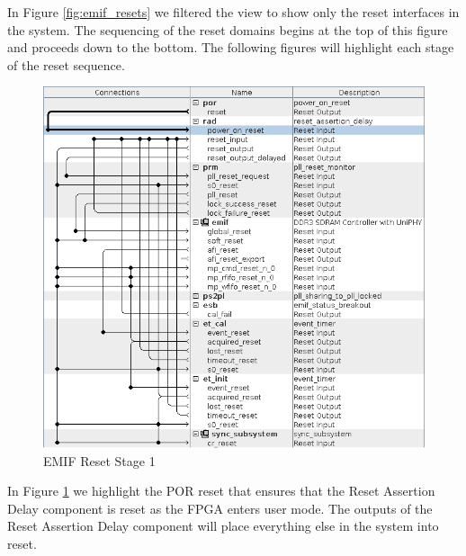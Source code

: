 \documentclass{article}
\begin{document}
\begin{flushleft}
In Figure \ref{fig:emif_resets} we filtered the view to show only the reset interfaces in the system.  The sequencing of the reset domains begins at the top of this figure and proceeds down to the bottom.  The following figures will highlight each stage of the reset sequence.

\begin{figure}[H]
\centering
\includegraphics[scale=0.675]{emif_reset_stage_1}
\caption{EMIF Reset Stage 1}
\label{fig:emif_reset_stage_1}
\end{figure}

In Figure \ref{fig:emif_reset_stage_1} we highlight the POR reset that ensures that the Reset Assertion Delay component is reset as the FPGA enters user mode. The outputs of the Reset Assertion Delay component will place everything else in the system into reset.


\end{flushleft}
\end{document}
